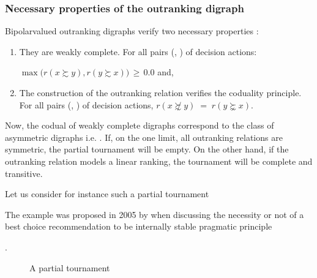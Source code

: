 \documentclass[a4paper,12pt,english]{sphinxhowto}
\let\sphinxpxdimen\pdfpxdimen\else\newdimen\sphinxpxdimen
\begin{document}
\subsubsection{Necessary properties of the outranking digraph}
\label{\detokenize{pearls:necessary-properties-of-the-outranking-digraph}}
\sphinxAtStartPar
Bipolar\sphinxhyphen{}valued outranking digraphs verify two necessary properties :
\begin{enumerate}
%
\item {} 
\sphinxAtStartPar
They are weakly complete. For all pairs (, ) of decision actions:

\sphinxAtStartPar
\(\max \big(r(x \succsim y),r(y \succsim x)\big)\, \geqslant \, 0.0\) and,

\item {} 
\sphinxAtStartPar
The construction of the outranking relation verifies the coduality principle. For all pairs (, ) of decision actions, \(r(x \not\succsim y) \;=\; r(y \succnsim x)\).

\end{enumerate}

\sphinxAtStartPar
Now, the codual of weakly complete digraphs correspond to the class of asymmetric digraphs i.e. . If, on the one limit, all outranking relations are symmetric, the partial tournament will be empty. On the other hand, if the outranking relation models a linear ranking, the tournament will be complete and transitive.

\sphinxAtStartPar
Let us consider for instance such a partial tournament %
\begin{footnote}[6]\sphinxAtStartFootnote
The example was proposed in 2005 by  when discussing the necessity or not of a  best choice recommendation to be internally stable \textendash{}pragmatic principle \textendash{} 
%
\end{footnote}.

\begin{figure}[H]
\centering
\capstart

\noindent\sphinxincludegraphics[width=200\sphinxpxdimen]{{Bouyssou4Orig}.png}
\caption{A partial tournament}\label{\detokenize{pearls:bouyssou4orig}}\end{figure}
\end{document}
